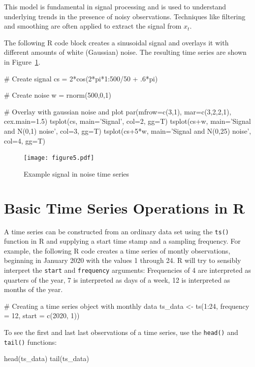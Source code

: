 This model is fundamental in signal processing and is used to understand underlying trends in the presence of noisy observations. Techniques like filtering and smoothing are often applied to extract the signal from $x_t$.

The following R code block creates a sinusoidal signal and overlays it with different amounts of white (Gaussian) noise. The resulting time series are shown in Figure~\ref{fig:figure5}.

\begin{Rcode}
# Create signal
cs = 2*cos(2*pi*1:500/50 + .6*pi)

# Create noise
w = rnorm(500,0,1)

# Overlay with gaussian noise and plot
par(mfrow=c(3,1), mar=c(3,2,2,1), cex.main=1.5)
tsplot(cs, main='Signal', col=2, gg=T)
tsplot(cs+w, main='Signal and N(0,1) noise', col=3, gg=T)
tsplot(cs+5*w, main='Signal and N(0,25) noise', col=4, gg=T)
\end{Rcode}

\begin{figure}
\centering
\texttt{[image: figure5.pdf]}
\caption{Example signal in noise time series}
\label{fig:figure5}
\end{figure}

\section{Basic Time Series Operations in R}

A time series can be constructed from an ordinary data set using the \texttt{ts()} function in R and supplying a start time stamp and a sampling frequency. For example, the following R code creates a time series of montly observations, beginning in January 2020 with the values 1 through 24. R will try to sensibly interpret the \texttt{start} and \texttt{frequency} arguments: Frequencies of 4 are interpreted as quarters of the year, 7 is interpreted as days of a week, 12 is interpreted as months of the year.

\begin{Rcode}
# Creating a time series object with monthly data
ts_data <- ts(1:24, frequency = 12, start = c(2020, 1))
\end{Rcode}

\noindent To see the first and last last observations of a time series, use the \texttt{head()} and \texttt{tail()} functions:

\begin{Rcode}
head(ts_data)
tail(ts_data)
\end{Rcode}


